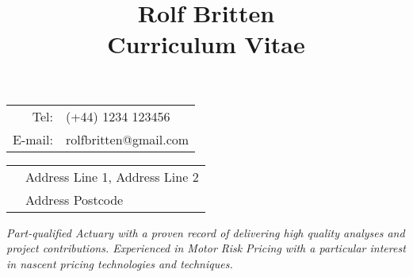 \documentclass[11pt]{article}
\title{\bfseries \Huge Rolf Britten \\ \Large Curriculum Vitae}
\date{}
\begin{document}
\maketitle
\vspace{-10mm}
\begin{minipage}[ht]{0.48\textwidth}
\begin{tabular}{r l}
Tel: & (+44) 1234 123456\\
E-mail: & rolfbritten@gmail.com\\
\end{tabular}
\end{minipage}
\begin{minipage}[ht]{0.48\textwidth}
\begin{tabular}{l l}
& Address Line 1, Address Line 2\\
& Address Postcode\
\end{tabular}
\end{minipage}

\begin{center} \emph{ Part-qualified Actuary with a proven record of delivering high quality analyses and project contributions. Experienced in Motor Risk Pricing with a particular interest in nascent pricing technologies and techniques.} \end{center}
\end{document}
